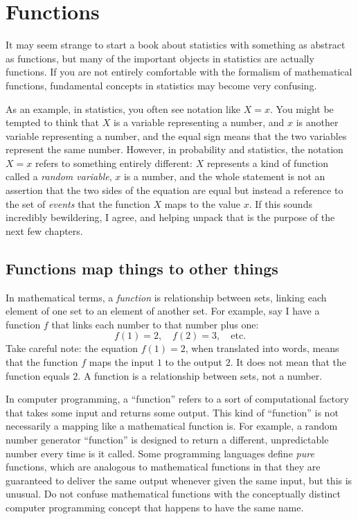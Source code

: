 
\chapter{Functions}
\label{chapter:functions}

It may seem strange to start a book about statistics with something as abstract
as functions, but many of the important objects in statistics are actually
functions. If you are not entirely comfortable with the formalism of mathematical
functions, fundamental concepts in statistics may become very confusing.

As an example, in statistics, you often see notation like $X=x$. You might be
tempted to think that $X$ is a variable representing a number, and $x$ is another
variable representing a number, and the equal sign means that the two variables
represent the same number. However, in probability and statistics, the notation
$X=x$ refers to something entirely different: $X$ represents a kind of function
called a \emph{random variable}, $x$ is a number, and the whole statement is not an
assertion that the two sides of the equation are equal but instead a reference
to the set of \emph{events} that the function $X$ maps to the value $x$. If this
sounds incredibly bewildering, I agree, and helping unpack that is the purpose
of the next few chapters.

\section{Functions map things to other things}

In mathematical terms, a \emph{function} is relationship between sets, linking
each element of one set to an element of another set. For example, say I have a
function $f$ that links each number to that number plus one:
\begin{equation*}
f(1) = 2, \quad f(2) = 3, \quad \text{etc.}
\end{equation*}
Take careful note: the equation $f(1) = 2$, when translated into words, means that the function
$f$ maps the input $1$ to the output $2$. It does not mean that the function equals
$2$. A function is a relationship between sets, not a number.

In computer programming, a ``function'' refers to a sort of computational factory
that takes some input and returns some output. This kind of ``function'' is not
necessarily a mapping like a mathematical function is. For example, a random number
generator ``function'' is designed to return a different, unpredictable number
every time is it called. Some programming languages define \emph{pure} functions,
which are analogous to mathematical functions in that they are guaranteed to deliver
the same output whenever given the same input, but this is unusual. Do not confuse
mathematical functions with the conceptually distinct computer programming concept
that happens to have the same name.

